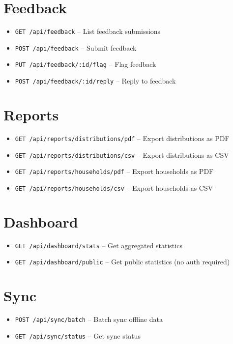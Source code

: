 \section{Feedback}
\begin{itemize}[leftmargin=1.2cm]
    \item \texttt{GET /api/feedback} -- List feedback submissions
    \item \texttt{POST /api/feedback} -- Submit feedback
    \item \texttt{PUT /api/feedback/:id/flag} -- Flag feedback
    \item \texttt{POST /api/feedback/:id/reply} -- Reply to feedback
\end{itemize}

\section{Reports}
\begin{itemize}[leftmargin=1.2cm]
    \item \texttt{GET /api/reports/distributions/pdf} -- Export distributions as PDF
    \item \texttt{GET /api/reports/distributions/csv} -- Export distributions as CSV
    \item \texttt{GET /api/reports/households/pdf} -- Export households as PDF
    \item \texttt{GET /api/reports/households/csv} -- Export households as CSV
\end{itemize}

\section{Dashboard}
\begin{itemize}[leftmargin=1.2cm]
    \item \texttt{GET /api/dashboard/stats} -- Get aggregated statistics
    \item \texttt{GET /api/dashboard/public} -- Get public statistics (no auth required)
\end{itemize}

\section{Sync}
\begin{itemize}[leftmargin=1.2cm]
    \item \texttt{POST /api/sync/batch} -- Batch sync offline data
    \item \texttt{GET /api/sync/status} -- Get sync status
\end{itemize}
